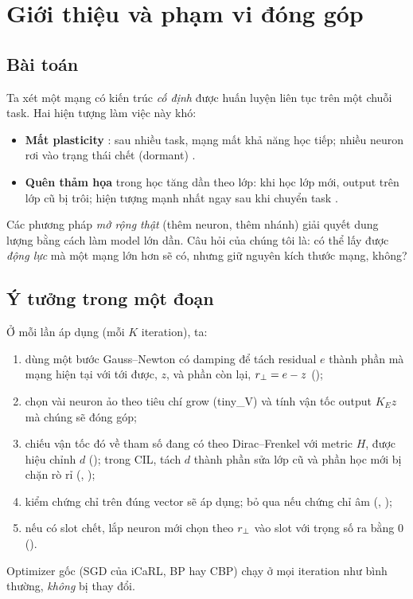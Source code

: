 \section{Giới thiệu và phạm vi đóng góp}\label{sec:intro}

\subsection{Bài toán}

Ta xét một mạng có kiến trúc \emph{cố định} được huấn luyện liên tục trên một chuỗi task. Hai hiện tượng làm việc này khó:
\begin{itemize}
  \item \textbf{Mất plasticity} \cite{dohare2024}: sau nhiều task, mạng mất khả năng học tiếp; nhiều neuron rơi vào trạng thái chết (dormant) \cite{sokar2023redo}.
  \item \textbf{Quên thảm họa} trong học tăng dần theo lớp: khi học lớp mới, output trên lớp cũ bị trôi; hiện tượng mạnh nhất ngay sau khi chuyển task \cite{delange2023gap}.
\end{itemize}
Các phương pháp \emph{mở rộng thật} (thêm neuron, thêm nhánh) giải quyết dung lượng bằng cách làm model lớn dần. Câu hỏi của chúng tôi là: có thể lấy được \emph{động lực} mà một mạng lớn hơn sẽ có, nhưng giữ nguyên kích thước mạng, không?

\subsection{Ý tưởng trong một đoạn}

Ở mỗi lần áp dụng (mỗi $K$ iteration), ta:
\begin{enumerate}
  \item dùng một bước Gauss--Newton có damping để tách residual $e$ thành phần mà mạng hiện tại với tới được, $z$, và phần còn lại, $r_{\perp}=e-z$ ();
  \item chọn vài neuron ảo theo tiêu chí grow (tiny\_V) và tính vận tốc output $K_E z$ mà chúng sẽ đóng góp;
  \item chiếu vận tốc đó về tham số đang có theo Dirac--Frenkel với metric $H$, được hiệu chỉnh $d$ (); trong CIL, tách $d$ thành phần sửa lớp cũ và phần học mới bị chặn rò rỉ (, );
  \item kiểm chứng chỉ trên đúng vector sẽ áp dụng; bỏ qua nếu chứng chỉ âm (, );
  \item nếu có slot chết, lắp neuron mới chọn theo $r_{\perp}$ vào slot với trọng số ra bằng $0$ ().
\end{enumerate}
Optimizer gốc (SGD của iCaRL, BP hay CBP) chạy ở mọi iteration như bình thường, \emph{không} bị thay đổi.

